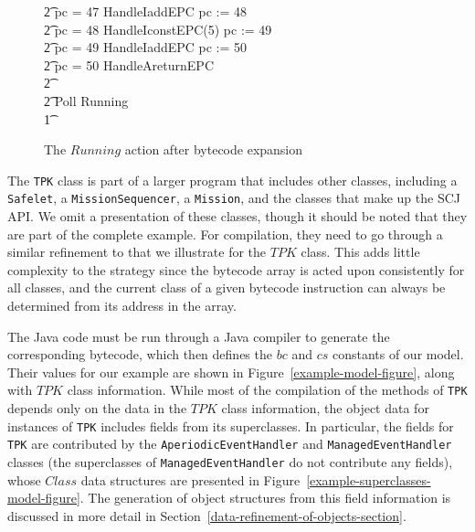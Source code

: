 \begin{figure}[tp!]
\begin{minipage}{0.5\textwidth}
{\begin{circus}
    \t2 {} \circelse pc = 47 \circthen HandleIaddEPC \circseq pc := 48 \\
    \t2 {} \circelse pc = 48 \circthen HandleIconstEPC(5) \circseq pc := 49 \\
    \t2 {} \circelse pc = 49 \circthen HandleIaddEPC \circseq pc := 50 \\
    \t2 {} \circelse pc = 50 \circthen HandleAreturnEPC \\
    \t2 {} \cdots {} \\
    \t2 \circfi \circseq Poll \circseq Running \\
    \t1 \circfi
  \end{circus}
  }
  \end{minipage}
  \normalsize
  \caption{The $Running$ action after bytecode expansion}
  \label{bytecode-expansion-example-figure}
\end{figure}

The \texttt{TPK} class is part of a larger program that includes other
classes, including a \texttt{Safelet}, a \texttt{MissionSequencer}, a
\texttt{Mission}, and the classes that make up the SCJ API.
We omit a presentation of these classes, though it should be noted
that they are part of the complete example.
For compilation, they need to go through a similar refinement to that
we illustrate for the $TPK$ class.
This adds little complexity to the strategy since the bytecode array
is acted upon consistently for all classes, and the current class of a
given bytecode instruction can always be determined from its address
in the array.

The Java code must be run through a Java compiler to generate the
corresponding bytecode, which then defines the $bc$ and $cs$ constants
of our model.
Their values for our example are shown in
Figure~\ref{example-model-figure}, along with $TPK$ class information.
While most of the compilation of the methods of \texttt{TPK} depends
only on the data in the $TPK$ class information, the object data for
instances of \texttt{TPK} includes fields from its superclasses.
In particular, the fields for \texttt{TPK} are contributed by the
\texttt{AperiodicEventHandler} and \texttt{ManagedEventHandler}
classes (the superclasses of \texttt{ManagedEventHandler} do not
contribute any fields), whose $Class$ data structures are presented in
Figure~\ref{example-superclasses-model-figure}.
The generation of object structures from this field information is
discussed in more detail in
Section~\ref{data-refinement-of-objects-section}.

